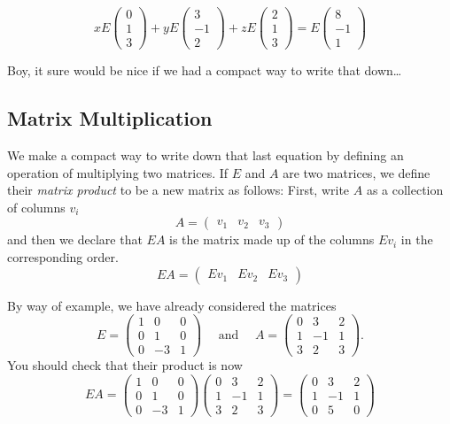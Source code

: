 \documentclass[11pt]{amsart}
\theoremstyle{definition}
\begin{document}
\[
x E\begin{pmatrix} 0 \\ 1 \\ 3 \end{pmatrix} +
y E\begin{pmatrix} 3 \\ -1 \\ 2 \end{pmatrix} +
z E\begin{pmatrix} 2 \\ 1 \\ 3 \end{pmatrix} =
E\begin{pmatrix} 8 \\ -1 \\ 1 \end{pmatrix}
\]

Boy, it sure would be nice if we had a compact way to write that down\dots


\subsection*{Matrix Multiplication}

We make a compact way to write down that last equation by defining an operation of multiplying two matrices.
If $E$ and $A$ are two matrices, we define their \emph{matrix product} to be a new matrix as follows:
First, write $A$ as a collection of columns $v_i$
\[
A = \begin{pmatrix} v_1 & v_2 & v_3 \end{pmatrix}
\]
and then we declare that $EA$ is the matrix made up of the columns $Ev_i$ in the corresponding order.
\[
EA = \begin{pmatrix} Ev_1 & Ev_2 & Ev_3 \end{pmatrix}
\]


By way of example, we have already considered the matrices
\[
E = \begin{pmatrix} 1 & 0 & 0 \\ 0 & 1 & 0 \\ 0 & -3 & 1 \end{pmatrix} \quad \text{ and } \quad
A = \begin{pmatrix} 0 & 3 & 2 \\ 1 & -1 & 1 \\ 3 & 2 & 3 \end{pmatrix}.
\]
You should check that their product is now
\[
EA = \begin{pmatrix} 1 & 0 & 0 \\ 0 & 1 & 0 \\ 0 & -3 & 1 \end{pmatrix}\begin{pmatrix} 0 & 3 & 2 \\ 1 & -1 & 1 \\ 3 & 2 & 3 \end{pmatrix} =
\begin{pmatrix} 0 & 3 & 2 \\ 1 & -1 & 1 \\ 0 & 5 & 0 \end{pmatrix}
\]
\end{document}
